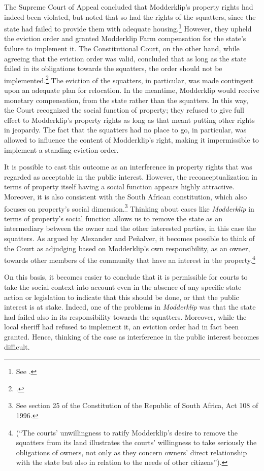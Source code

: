 \documentclass[12pt,a4paper]{book} %
\begin{document}
The Supreme Court of Appeal concluded that Modderklip's property rights had indeed been violated, but noted that so had the rights of the squatters, since the state had failed to provide them with adequate housing.\footnote{See \cite{modderklip04}.} However, they upheld the eviction order and granted Modderklip Farm compensation for the state's failure to implement it. The Constitutional Court, on the other hand, while agreeing that the eviction order was valid, concluded that as long as the state failed in its obligations towards the squatters, the order should not be implemented.\footcite{modderklip05} The eviction of the squatters, in particular, was made contingent upon an adequate plan for relocation. In the meantime, Modderklip would receive monetary compensation, from the state rather than the squatters. In this way, the Court recognized the social function of property; they refused to give full effect to Modderklip's property rights as long as that meant putting other rights in jeopardy. The fact that the squatters had no place to go, in particular, was allowed to influence the content of Modderklip's right, making it impermissible to implement a standing eviction order.

It is possible to cast this outcome as an interference in property rights that was regarded as acceptable in the public interest. However, the reconceptualization in terms of property itself having a social function appears highly attractive. Moreover, it is also consistent with the South African constitution, which also focuses on property's social dimension.\footnote{See section 25 of the Constitution of the Republic of South Africa, Act 108 of 1996.} Thinking about cases like {\it Modderklip} in terms of property's social function allows us to remove the state as an intermediary between the owner and the other interested parties, in this case the squatters. As argued by Alexander and Pe\~{n}alver, it becomes possible to think of the Court as adjudging based on Modderklip's own responsibility, as an owner, towards other members of the community that have an interest in the property.\footnote{\cite[157]{alexander11} (``The courts' unwillingness to ratify Modderklip's desire to remove the squatters from its land illustrates the courts' willingness to take seriously the obligations of owners, not only as they concern owners' direct relationship with the state but also in relation to the needs of other citizens'').}

On this basis, it becomes easier to conclude that it is permissible for courts to take the social context into account even in the absence of any specific state action or legislation to indicate that this should be done, or that the public interest is at stake. Indeed, one of the problems in {\it Modderklip} was that the state had failed also in its responsibility towards the squatters. Moreover, while the local sheriff had refused to implement it, an eviction order had in fact been granted. Hence, thinking of the case as interference in the public interest becomes difficult.
\end{document}
